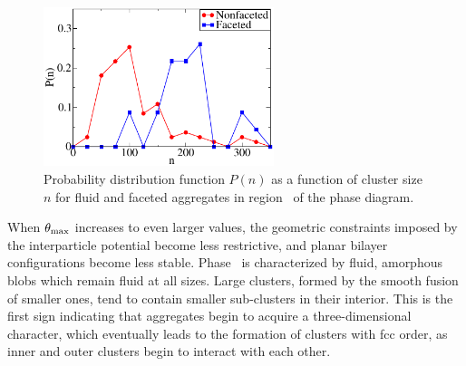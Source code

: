 \begin{figure}
	\begin{center}\includegraphics[width=0.6\textwidth]{janus/facetvsnon}\end{center}
	\caption[Probability distribution function of cluster size]{Probability distribution function $P(n)$ as a function of cluster size $n$ for fluid and faceted aggregates
	in region~ of the phase diagram.}\label{fig:facetvsnon}
\end{figure}

When $\theta_{\rm max}$ increases to even larger values, the geometric constraints imposed by the interparticle potential become less restrictive, and  planar bilayer configurations
become less stable. 
Phase~ is characterized by fluid, amorphous blobs which remain fluid at all sizes. 
Large clusters, formed by the smooth fusion of smaller ones, tend to contain smaller sub-clusters in their interior. 
This is the first sign indicating that aggregates begin to acquire a three-dimensional character, which eventually leads to the formation of clusters with fcc  order, as inner and outer clusters begin to interact with each other.


